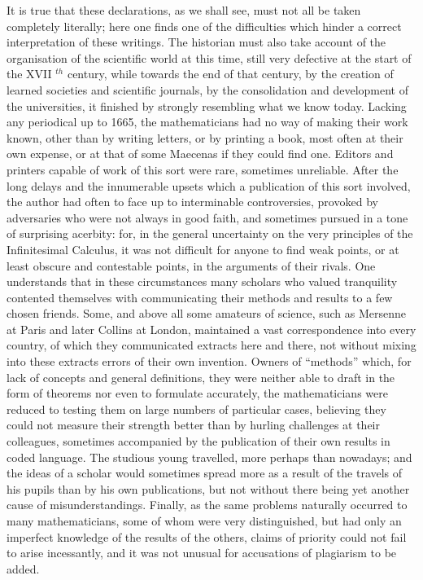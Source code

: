 It is true that these declarations, as we shall see, must not all be taken completely literally; here one finds one of the difficulties which hinder a correct interpretation of these writings. The historian must also take account of the organisation of the scientific world at this time, still very defective at the start of the XVII \(^{th}\) century, while towards the end of that century, by the creation of learned societies and scientific journals, by the consolidation and development of the universities, it finished by strongly resembling what we know today. Lacking any periodical up to 1665, the mathematicians had no way of making their work known, other than by writing letters, or by printing a book, most often at their own expense, or at that of some Maecenas if they could find one. Editors and printers capable of work of this sort were rare, sometimes unreliable. After the long delays and the innumerable upsets which a publication of this sort involved, the author had often to face up to interminable controversies, provoked by adversaries who were not always in good faith, and sometimes pursued in a tone of surprising acerbity: for, in the general uncertainty on the very principles of the Infinitesimal Calculus, it was not difficult for anyone to find weak points, or at least obscure and contestable points, in the arguments of their rivals. One understands that in these circumstances many scholars who valued tranquility contented themselves with communicating their methods and results to a few chosen friends. Some, and above all some amateurs of science, such as Mersenne at Paris and later Collins at London, maintained a vast correspondence into every country, of which they communicated extracts here and there, not without mixing into these extracts errors of their own invention. Owners of ``methods'' which, for lack of concepts and general definitions, they were neither able to draft in the form of theorems nor even to formulate accurately, the mathematicians were reduced to testing them on large numbers of particular cases, believing they could not measure their strength better than by hurling challenges at their colleagues, sometimes accompanied by the publication of their own results in coded language. The studious young travelled, more perhaps than nowadays; and the ideas of a scholar would sometimes spread more as a result of the travels of his pupils than by his own publications, but not without there being yet another cause of misunderstandings. Finally, as the same problems naturally occurred to many mathematicians, some of whom were very distinguished, but had only an imperfect knowledge of the results of the others, claims of priority could not fail to arise incessantly, and it was not unusual for accusations of plagiarism to be added.

